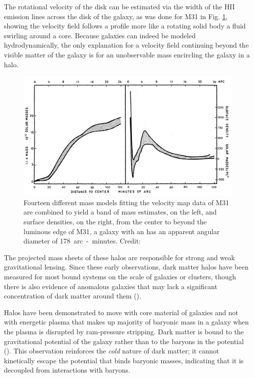\documentclass{paper}
\begin{document}
  The rotational velocity of the disk can be estimated via the width of the 
  HII emission lines across the disk of the galaxy, as was done for M31 in 
  Fig. \ref{fig:DM-masscurve}, showing the velocity field follows a profile more 
  like a rotating solid body a fluid swirling around a core. Because galaxies 
  can indeed be modeled hydrodynamically, the only explanation for a velocity 
  field continuing beyond the visible matter of the galaxy is for an 
  unobservable mass encircling the galaxy in a halo.

  \begin{figure}[H]
    \begin{centering}
    \includegraphics[scale=0.4]{DM-masscurve.pdf}
    \caption{Fourteen different mass models fitting the velocity map data of
      M31 are combined to yield a band of mass estimates, on the left, and 
      surface densities, on the right, from the center to beyond the luminous 
      edge of M31, a galaxy with an has an apparent angular diameter of 
      \SI{178}{arc-minutes}.
    Credit: \cite{1970ApJ...159..379R}}
    \label{fig:DM-masscurve}
    \end{centering}
  \end{figure}

  The projected mass sheets of these halos are responsible for strong and weak 
  gravitational lensing. Since these early observations, dark matter halos 
  have been measured for most bound systems on the scale of galaxies or 
  clusters, though there is also evidence of anomalous galaxies that may lack 
  a significant concentration of dark matter around them 
  (\cite{10.1093/mnras/stab3491}). 

  Halos have been demonstrated to move with core material of galaxies and not 
  with energetic plasma that makes up majority of baryonic mass in a galaxy 
  when the plasma is disrupted by ram-pressure stripping.  Dark matter is 
  bound to the gravitational potential of the galaxy rather than to the 
  baryons in the potential (\cite{Clowe_2006}). This observation reinforces 
  the \textit{cold} nature of dark matter; it cannot kinetically escape the 
  potential that binds baryonic masses, indicating that it is decoupled from 
  interactions with baryons. 
\end{document}

